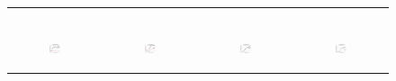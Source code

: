 \begin{figure}[ht]
\begin{tabular}{cccc}
\begin{subfigure}[b]{0.22\textwidth}
	  \end{subfigure} \\
	  \begin{subfigure}[b]{0.22\textwidth}
	  	\includegraphics[width=110pt]{images/diffFA_CF2G_friendster10M_maxgraphcut.pdf}
			\caption{}
			\label{appfig:diffFA_CF2G_friendster10M_maxgraphcut}
	  \end{subfigure} &
	  \begin{subfigure}[b]{0.22\textwidth}
	  	\includegraphics[width=110pt]{images/diffFA_CF2G_arabic2005_maxgraphcut.pdf}
			\caption{}
			\label{appfig:diffFA_CF2G_arabic2005_maxgraphcut}
	  \end{subfigure} &
	  \begin{subfigure}[b]{0.22\textwidth}
	  	\includegraphics[width=110pt]{images/diffFA_CF2G_uk2005_maxgraphcut.pdf}
			\caption{}
			\label{appfig:diffFA_CF2G_uk2005_maxgraphcut}
	  \end{subfigure} &
	  \begin{subfigure}[b]{0.22\textwidth}
	  	\includegraphics[width=110pt]{images/diffFA_CF2G_it2004_maxgraphcut.pdf}
			\caption{}
			\label{appfig:diffFA_CF2G_it2004_maxgraphcut}

\end{subfigure}
\end{tabular}
\end{figure}
